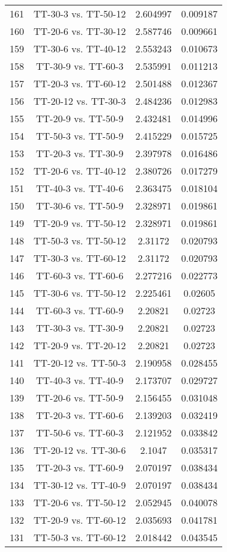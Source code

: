 \documentclass[a4paper,10pt]{article}
\begin{document}
\begin{landscape}
\begin{table}[!htp]
\begin{tabular}{cccc}
161&TT-30-3 vs. TT-50-12&2.604997&0.009187\\
160&TT-20-6 vs. TT-30-12&2.587746&0.009661\\
159&TT-30-6 vs. TT-40-12&2.553243&0.010673\\
158&TT-30-9 vs. TT-60-3&2.535991&0.011213\\
157&TT-20-3 vs. TT-60-12&2.501488&0.012367\\
156&TT-20-12 vs. TT-30-3&2.484236&0.012983\\
155&TT-20-9 vs. TT-50-9&2.432481&0.014996\\
154&TT-50-3 vs. TT-50-9&2.415229&0.015725\\
153&TT-20-3 vs. TT-30-9&2.397978&0.016486\\
152&TT-20-6 vs. TT-40-12&2.380726&0.017279\\
151&TT-40-3 vs. TT-40-6&2.363475&0.018104\\
150&TT-30-6 vs. TT-50-9&2.328971&0.019861\\
149&TT-20-9 vs. TT-50-12&2.328971&0.019861\\
148&TT-50-3 vs. TT-50-12&2.31172&0.020793\\
147&TT-30-3 vs. TT-60-12&2.31172&0.020793\\
146&TT-60-3 vs. TT-60-6&2.277216&0.022773\\
145&TT-30-6 vs. TT-50-12&2.225461&0.02605\\
144&TT-60-3 vs. TT-60-9&2.20821&0.02723\\
143&TT-30-3 vs. TT-30-9&2.20821&0.02723\\
142&TT-20-9 vs. TT-20-12&2.20821&0.02723\\
141&TT-20-12 vs. TT-50-3&2.190958&0.028455\\
140&TT-40-3 vs. TT-40-9&2.173707&0.029727\\
139&TT-20-6 vs. TT-50-9&2.156455&0.031048\\
138&TT-20-3 vs. TT-60-6&2.139203&0.032419\\
137&TT-50-6 vs. TT-60-3&2.121952&0.033842\\
136&TT-20-12 vs. TT-30-6&2.1047&0.035317\\
135&TT-20-3 vs. TT-60-9&2.070197&0.038434\\
134&TT-30-12 vs. TT-40-9&2.070197&0.038434\\
133&TT-20-6 vs. TT-50-12&2.052945&0.040078\\
132&TT-20-9 vs. TT-60-12&2.035693&0.041781\\
131&TT-50-3 vs. TT-60-12&2.018442&0.043545\\

\end{tabular}
\end{table}
\end{landscape}
\end{document}
